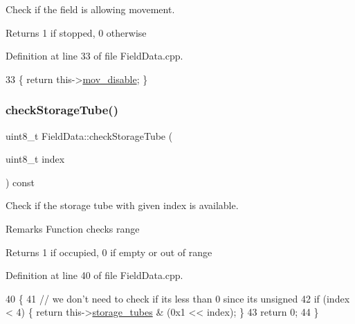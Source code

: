 Check if the field is allowing movement. 

\begin{DoxyReturn}{Returns}
1 if stopped, 0 otherwise 
\end{DoxyReturn}


Definition at line 33 of file Field\+Data.\+cpp.


\begin{DoxyCode}
33 \{ \textcolor{keywordflow}{return} this->\hyperlink{class_field_data_a82ed3c6771df262aae42cb332ccc7d0c}{mov\_disable}; \}
\end{DoxyCode}
\mbox{\label{class_field_data_aace8d0ab4c931b35ab85b71710079459}} 
\subsubsection{\texorpdfstring{check\+Storage\+Tube()}{checkStorageTube()}}
{\footnotesize\ttfamily uint8\+\_\+t Field\+Data\+::check\+Storage\+Tube (\begin{DoxyParamCaption}\item[{uint8\+\_\+t}]{index }\end{DoxyParamCaption}) const}



Check if the storage tube with given index is available. 

\begin{DoxyRemark}{Remarks}
Function checks range 
\end{DoxyRemark}
\begin{DoxyReturn}{Returns}
1 if occupied, 0 if empty or out of range 
\end{DoxyReturn}


Definition at line 40 of file Field\+Data.\+cpp.


\begin{DoxyCode}
40                                                        \{
41     \textcolor{comment}{// we don't need to check if its less than 0 since its unsigned}
42     \textcolor{keywordflow}{if} (index < 4) \{ \textcolor{keywordflow}{return} this->\hyperlink{class_field_data_a215428022f049a8f0b6702783291b636}{storage\_tubes} & (0x1 << index); \}
43     \textcolor{keywordflow}{return} 0;
44 \}
\end{DoxyCode}
\mbox{\label{class_field_data_a645f5d698b0048e4aa718327a5e1550a}} 
